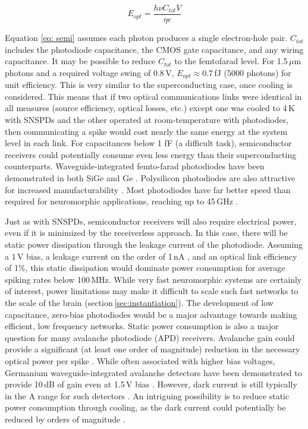 \documentclass[twocolumn]{article}
\begin{document}
\begin{equation}
\label{eq: semi}
    E_{opt} = \frac{h \nu C_{tot} V}{\eta e}
\end{equation}

Equation \ref{eq: semi} assumes each photon produces a single electron-hole pair. $C_{tot}$ includes the photodiode capacitance, the CMOS gate capacitance, and any wiring capacitance. It may be possible to reduce $C_{tot}$ to the femtofarad level. For 1.5\,$\mu$m photons and a required voltage swing of 0.8\,V, $E_{opt} \approx 0.7 $\,fJ (5000 photons) for unit efficiency. This is very similar to the superconducting case, once cooling is considered. This means that if two optical communications links were identical in all measures (source efficiency, optical losses, etc.) except one was cooled to 4\,K with SNSPDs and the other operated at room-temperature with photodiodes, then communicating a spike would cost nearly the same energy at the system level in each link. For capacitances below 1 fF (a difficult task), semiconductor receivers could potentially consume even less energy than their superconducting counterparts. Waveguide-integrated femto-farad photodiodes have been demonstrated in both SiGe and Ge \cite{derose2011ultra}. Polysilicon photodiodes are also attractive for increased manufacturability \cite{meor2014}. Most photodiodes have far better speed than required for neuromorphic applications, reaching up to 45\,GHz \cite{derose2011ultra}.

Just as with SNSPDs, semiconductor receivers will also require electrical power, even if it is minimized by the receiverless approach. In this case, there will be static power dissipation through the leakage current of the photodiode. Assuming a 1\,V bias, a leakage current on the order of 1\,nA \cite{zhang2020scalable}, and an optical link efficiency of 1\%, this static dissipation would dominate power consumption for average spiking rates below 100\,MHz. While very fast neuromorphic systems are certainly of interest, power limitations may make it difficult to scale such fast networks to the scale of the brain (section\,\ref{sec:instantiation}). The development of low capacitance, zero-bias photodiodes \cite{nozaki2018forward} would be a major advantage towards making efficient, low frequency networks. Static power consumption is also a major question for many avalanche photodiode (APD) receivers. Avalanche gain could provide a significant (at least one order of magnitude) reduction in the necessary optical power per spike \cite{miller2017attojoule}. While often associated with higher bias voltages, Germanium waveguide-integrated avalanche detectors have been demonstrated to provide 10\,dB of gain even at 1.5\,V bias \cite{assefa2010reinventing}. However, dark current is still typically in the \textmu A range for such detectors \cite{assefa2010reinventing, virot2014germanium}. An intriguing possibility is to reduce static power consumption through cooling, as the dark current could potentially be reduced by orders of magnitude \cite{pizzone2020analysis}.
\end{document}
